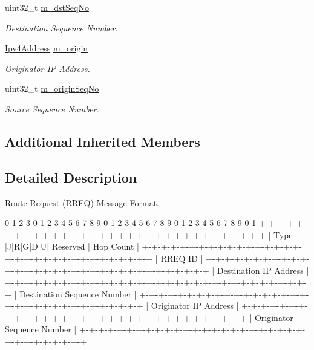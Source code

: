 \begin{DoxyCompactItemize}
uint32\+\_\+t \hyperlink{classns3_1_1aodv_1_1RreqHeader_ae20452555cbc98773d8dd496d15606ec}{m\+\_\+dst\+Seq\+No}
\begin{DoxyCompactList}\small\item\em Destination Sequence Number. \end{DoxyCompactList}\item 
\hyperlink{classns3_1_1Ipv4Address}{Ipv4\+Address} \hyperlink{classns3_1_1aodv_1_1RreqHeader_a64d3aa3822002c516f26fc76a59e1838}{m\+\_\+origin}
\begin{DoxyCompactList}\small\item\em Originator IP \hyperlink{classns3_1_1Address}{Address}. \end{DoxyCompactList}\item 
uint32\+\_\+t \hyperlink{classns3_1_1aodv_1_1RreqHeader_a0d80d0807dc4a17d937e9b48ee19d684}{m\+\_\+origin\+Seq\+No}
\begin{DoxyCompactList}\small\item\em Source Sequence Number. \end{DoxyCompactList}\end{DoxyCompactItemize}
\subsection*{Additional Inherited Members}


\subsection{Detailed Description}
Route Request (R\+R\+EQ) Message Format. 

\begin{DoxyVerb}0                   1                   2                   3
0 1 2 3 4 5 6 7 8 9 0 1 2 3 4 5 6 7 8 9 0 1 2 3 4 5 6 7 8 9 0 1
+-+-+-+-+-+-+-+-+-+-+-+-+-+-+-+-+-+-+-+-+-+-+-+-+-+-+-+-+-+-+-+-+
|     Type      |J|R|G|D|U|   Reserved          |   Hop Count   |
+-+-+-+-+-+-+-+-+-+-+-+-+-+-+-+-+-+-+-+-+-+-+-+-+-+-+-+-+-+-+-+-+
|                            RREQ ID                            |
+-+-+-+-+-+-+-+-+-+-+-+-+-+-+-+-+-+-+-+-+-+-+-+-+-+-+-+-+-+-+-+-+
|                    Destination IP Address                     |
+-+-+-+-+-+-+-+-+-+-+-+-+-+-+-+-+-+-+-+-+-+-+-+-+-+-+-+-+-+-+-+-+
|                  Destination Sequence Number                  |
+-+-+-+-+-+-+-+-+-+-+-+-+-+-+-+-+-+-+-+-+-+-+-+-+-+-+-+-+-+-+-+-+
|                    Originator IP Address                      |
+-+-+-+-+-+-+-+-+-+-+-+-+-+-+-+-+-+-+-+-+-+-+-+-+-+-+-+-+-+-+-+-+
|                  Originator Sequence Number                   |
+-+-+-+-+-+-+-+-+-+-+-+-+-+-+-+-+-+-+-+-+-+-+-+-+-+-+-+-+-+-+-+-+
\end{DoxyVerb}
 

